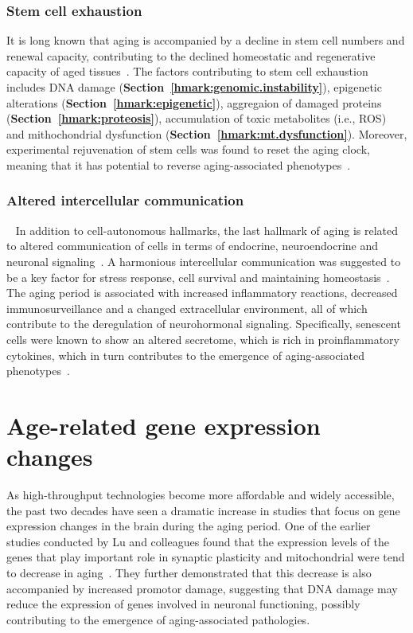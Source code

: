 \subsubsection{Stem cell exhaustion}
It is long known that aging is accompanied by a decline in stem cell numbers and renewal capacity, 
contributing to the declined homeostatic and regenerative capacity of aged tissues~\cite{Oh2014}.
The factors contributing to stem cell exhaustion includes
DNA damage (\textbf{Section~\ref{hmark:genomic.instability}}), 
epigenetic alterations (\textbf{Section~\ref{hmark:epigenetic}}), 
aggregaion of damaged proteins (\textbf{Section~\ref{hmark:proteosis}}),
accumulation of toxic metabolites (i.e., ROS) and
mithochondrial dysfunction (\textbf{Section~\ref{hmark:mt.dysfunction}}).
Moreover, experimental rejuvenation of stem cells was found to reset the aging clock, 
meaning that it has potential to reverse aging-associated phenotypes~\cite{Rando2012}.

\subsubsection{Altered intercellular communication}~\label{hmark:altered.comm}
In addition to cell-autonomous hallmarks, the last hallmark of aging is related to altered communication of cells 
in terms of endocrine, neuroendocrine and neuronal signaling~\cite{Russell2007}.
A harmonious intercellular communication was suggested to be a key factor for stress response, cell survival and maintaining homeostasis~\cite{Tan2021}.
The aging period is associated with increased inflammatory reactions, decreased immunosurveillance and a changed extracellular environment,
all of which contribute to the deregulation of neurohormonal signaling.
Specifically, senescent cells were known to show an altered secretome, which is rich in proinflammatory cytokines, 
which in turn contributes to the emergence of aging-associated phenotypes~\cite{Childs2016, Kuilman2010}.

\section{Age-related gene expression changes}
As high-throughput technologies become more affordable and widely accessible, 
the past two decades have seen a dramatic increase in studies that focus on gene expression changes in the brain during the aging period.
One of the earlier studies conducted by Lu and colleagues found that the expression levels of the genes 
that play important role in synaptic plasticity and mitochondrial were tend to decrease in aging~\cite{Lu2004}. 
They further demonstrated that this decrease is also accompanied by increased promotor damage, 
suggesting that DNA damage may reduce the expression of genes involved in neuronal functioning, 
possibly contributing to the emergence of aging-associated pathologies.

